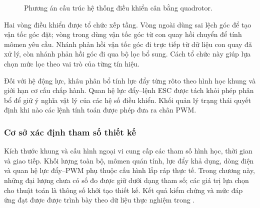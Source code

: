 \begin{figure}[htbp]
	\centering
	\resizebox{\linewidth}{!}{}
	\caption{Phương án cấu trúc hệ thống điều khiển cân bằng quadrotor.}
	\label{fig:design-system-architecture}
\end{figure}

Hai vòng điều khiển được tổ chức xếp tầng. Vòng ngoài dùng sai lệch góc để tạo vận tốc góc đặt; vòng trong dùng vận tốc góc từ con quay hồi chuyển để tính mômen yêu cầu. Nhánh phản hồi vận tốc góc đi trực tiếp từ dữ liệu con quay đã xử lý, còn nhánh phản hồi góc đi qua bộ lọc bổ sung. Cách tổ chức này giúp lựa chọn mức lọc theo vai trò của từng tín hiệu.

Đối với hệ động lực, khâu phân bổ tính lực đẩy từng rôto theo hình học khung và giới hạn cơ cấu chấp hành. Quan hệ lực đẩy--lệnh ESC được tách khỏi phép phân bổ để giữ ý nghĩa vật lý của các hệ số điều khiển. Khối quản lý trạng thái quyết định khi nào các lệnh tính toán được phép đưa ra chân PWM.

\subsubsection{Cơ sở xác định tham số thiết kế}

Kích thước khung và cấu hình ngoại vi cung cấp các tham số hình học, thời gian và giao tiếp. Khối lượng toàn bộ, mômen quán tính, lực đẩy khả dụng, dòng điện và quan hệ lực đẩy--PWM phụ thuộc cấu hình lắp ráp thực tế. Trong chương này, những đại lượng chưa có số đo được giữ dưới dạng tham số; các giá trị lựa chọn cho thuật toán là thông số khởi tạo thiết kế. Kết quả kiểm chứng và mức đáp ứng đạt được được trình bày theo dữ liệu thực nghiệm trong .
